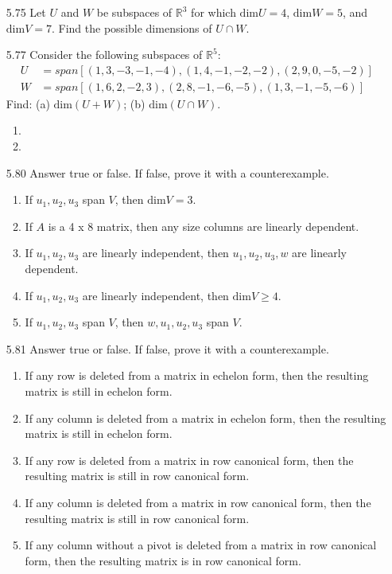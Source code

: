 \documentclass[12pt]{article}
\begin{document}
\begin{enumerate}
\item[5.75] Let $U$ and $W$ be subspaces of $\mathbb{R}^3$ for which $\mathrm{dim}U=4$, $\mathrm{dim}W=5$, and $\mathrm{dim}V=7$. Find the possible dimensions of $U \cap W$.

\item[5.77] Consider the following subspaces of $\mathbb{R}^5$:
	\begin{align*}
		U &= span[(1,3,-3,-1,-4),(1,4,-1,-2,-2),(2,9,0,-5,-2)]\\
		W &= span[(1,6,2,-2,3),(2,8,-1,-6,-5),(1,3,-1,-5,-6)]
	\end{align*}
	Find: (a) $\mathrm{dim}(U+W)$; (b) $\mathrm{dim}(U\cap W)$.
	\begin{enumerate}
	\item
	\item
	\end{enumerate}

\item[5.80] Answer true or false. If false, prove it with a counterexample.
	\begin{enumerate}
	\item If $u_1,u_2,u_3$ span $V$, then $\mathrm{dim}V = 3$.
	\item If $A$ is a 4 x 8 matrix, then any size columns are linearly dependent.
	\item If $u_1,u_2,u_3$ are linearly independent, then $u_1,u_2,u_3,w$ are linearly dependent.
	\item If $u_1,u_2,u_3$ are linearly independent, then $\mathrm{dim}V \geq 4$.
	\item If $u_1,u_2,u_3$ span $V$, then $w,u_1,u_2,u_3$ span $V$.
	\end{enumerate}

\item[5.81] Answer true or false. If false, prove it with a counterexample.
	\begin{enumerate}
	\item If any row is deleted from a matrix in echelon form, then the resulting matrix is still in echelon form.
	\item If any column is deleted from a matrix in echelon form, then the resulting matrix is still in echelon form.
	\item If any row is deleted from a matrix in row canonical form, then the resulting matrix is still in row canonical form.
	\item If any column is deleted from a matrix in row canonical form, then the resulting matrix is still in row canonical form.
	\item If any column without a pivot is deleted from a matrix in row canonical form, then the resulting matrix is in row canonical form.
	\end{enumerate}


\end{enumerate}
\end{document}
